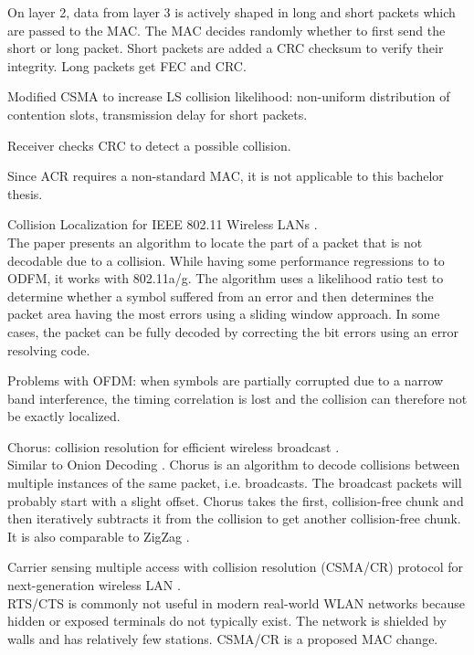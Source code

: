 On layer 2, data from layer 3 is actively shaped in long and short packets which are passed to the MAC. The MAC decides randomly whether to first send the short or long packet. Short packets are added a CRC checksum to verify their integrity. Long packets get FEC and CRC.

Modified CSMA to increase LS collision likelihood: non-uniform distribution of contention slots, transmission delay for short packets.

Receiver checks CRC to detect a possible collision.

Since ACR requires a non-standard MAC, it is not applicable to this bachelor thesis.

Collision Localization for IEEE 802.11 Wireless LANs \cite{keene2010}.\\

The paper presents an algorithm to locate the part of a packet that is not decodable due to a collision. While having some performance regressions to to ODFM, it works with 802.11a/g. The algorithm uses a likelihood ratio test to determine whether a symbol suffered from an error and then determines the packet area having the most errors using a sliding window approach. In some cases, the packet can be fully decoded by correcting the bit errors using an error resolving code.

Problems with OFDM: when symbols are partially corrupted due to a narrow band interference, the timing correlation is lost and the collision can therefore not be exactly localized.

Chorus: collision resolution for efficient wireless broadcast \cite{zhang2010}.\\

Similar to Onion Decoding \cite{wang2010}. Chorus is an algorithm to decode collisions between multiple instances of the same packet, i.e. broadcasts. The broadcast packets will probably start with a slight offset. Chorus takes the first, collision-free chunk and then iteratively subtracts it from the collision to get another collision-free chunk. It is also comparable to ZigZag \cite{gollakota2008}.

Carrier sensing multiple access with collision resolution (CSMA/CR) protocol for next-generation wireless LAN \cite{choi2013}.\\

RTS/CTS is commonly not useful in modern real-world WLAN networks because hidden or exposed terminals do not typically exist. The network is shielded by walls and has relatively few stations. CSMA/CR is a proposed MAC change.

